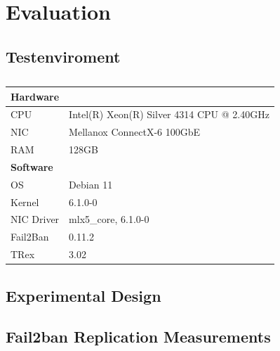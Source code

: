 
%

\chapter{Evaluation}

\section{Testenviroment}

\begin{table}[b!]
	\renewcommand{\arraystretch}{1.5}
	\caption[Testbed Summary]{}
	 \label{tab:specs}
	 \centering
	\small
	\begin{tabular}{ll}
	\toprule
	\multicolumn{2}{l}{\textbf{Hardware}}                                        \\ \midrule
	CPU      & Intel(R) Xeon(R) Silver 4314 CPU @ 2.40GHz \\
	NIC      & Mellanox ConnectX-6 100GbE                       \\
	RAM        & 128GB                                                       \\ \bottomrule
	\multicolumn{2}{l}{\textbf{Software}}                                        \\ \midrule
	OS         & Debian 11                                                  \\
	Kernel          & 6.1.0-0                                                   \\
	NIC Driver & mlx5\_core, 6.1.0-0                                      \\
	Fail2Ban       & 0.11.2                                     \\
	TRex            & 3.02                                       \\ \bottomrule
	\end{tabular}
\end{table}

\section{Experimental Design}

\section{Fail2ban Replication Measurements}


